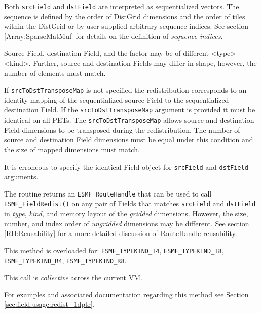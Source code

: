    Both {\tt srcField} and {\tt dstField} are interpreted as sequentialized 
   vectors. The sequence is defined by the order of DistGrid dimensions and the
   order of tiles within the DistGrid or by user-supplied arbitrary sequence
   indices. See section \ref{Array:SparseMatMul} for details on the definition
   of {\em sequence indices}.
  
   Source Field, destination Field, and the factor may be of different
   <type><kind>. Further, source and destination Fields may differ in shape,
   however, the number of elements must match. 
    
   If {\tt srcToDstTransposeMap} is not specified the redistribution corresponds
   to an identity mapping of the sequentialized source Field to the
   sequentialized destination Field. If the {\tt srcToDstTransposeMap}
   argument is provided it must be identical on all PETs. The
   {\tt srcToDstTransposeMap} allows source and destination Field dimensions to
   be transposed during the redistribution. The number of source and destination
   Field dimensions must be equal under this condition and the size of mapped
   dimensions must match.
    
   It is erroneous to specify the identical Field object for {\tt srcField} and
   {\tt dstField} arguments. 
  
     The routine returns an {\tt ESMF\_RouteHandle} that can be used to call 
     {\tt ESMF\_FieldRedist()} on any pair of Fields that matches 
     {\tt srcField} and {\tt dstField} in {\em type}, {\em kind}, and 
     memory layout of the {\em gridded} dimensions. However, the size, number, 
     and index order of {\em ungridded} dimensions may be different. See section
     \ref{RH:Reusability} for a more detailed discussion of RouteHandle 
     reusability.
  
   This method is overloaded for:\newline
   {\tt ESMF\_TYPEKIND\_I4}, {\tt ESMF\_TYPEKIND\_I8},\newline 
   {\tt ESMF\_TYPEKIND\_R4}, {\tt ESMF\_TYPEKIND\_R8}.
   \newline
    
   This call is {\em collective} across the current VM.  
   
   For examples and associated documentation regarding this method see Section
   \ref{sec:field:usage:redist_1dptr}. 
   
